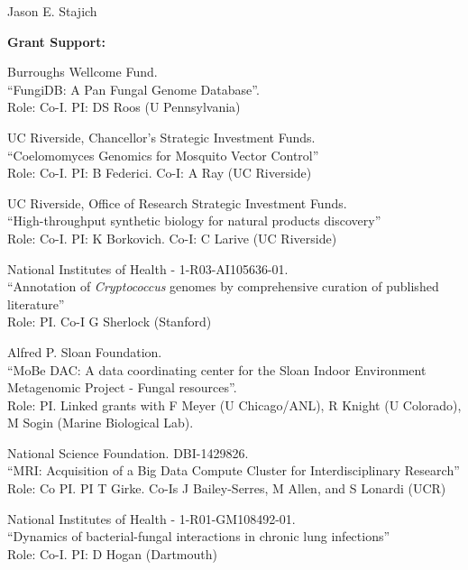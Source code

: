 \documentclass[10pt]{article}
\begin{document}
\begin{cv}{\centerline{Jason E. Stajich}}
\begin{cvlistcompact}{\bf Grant Support:}
\item [{\bf Completed support}]

\item [2010-2013] Burroughs Wellcome Fund. \\
 ``FungiDB: A Pan Fungal Genome Database''. \\
Role: Co-I. PI: DS Roos (U Pennsylvania)

\item [2011-2012] UC Riverside, Chancellor's Strategic Investment
  Funds. \\
``Coelomomyces Genomics for Mosquito Vector Control'' \\
Role: Co-I. PI: B Federici. Co-I: A Ray (UC Riverside)

\item [2013-2014] UC Riverside, Office of Research Strategic Investment
  Funds. \\
``High-throughput synthetic biology for natural products discovery'' \\
Role: Co-I. PI: K Borkovich. Co-I: C Larive (UC Riverside)

\item [2013-2014] National Institutes of Health - 1-R03-AI105636-01. \\
``Annotation of \textit{Cryptococcus} genomes by comprehensive
  curation of published literature'' \\
Role: PI. Co-I G Sherlock (Stanford)

  \item [2011-2014] Alfred P. Sloan Foundation. \\
``MoBe DAC: A data coordinating center for the Sloan Indoor
Environment Metagenomic Project - Fungal resources''. \\
Role: PI.  Linked grants with F Meyer (U Chicago/ANL), R Knight (U Colorado), M Sogin (Marine Biological Lab).

\item [2014-2015] National Science Foundation. DBI-1429826. \\
``MRI: Acquisition of a Big Data Compute Cluster for Interdisciplinary
  Research''
Role: Co PI. PI T Girke. Co-Is J Bailey-Serres, M Allen, and S Lonardi (UCR)

\item [2014-2017] National Institutes of Health - 1-R01-GM108492-01. \\
``Dynamics of bacterial-fungal interactions in chronic lung infections'' \\
  Role: Co-I. PI: D Hogan (Dartmouth)


\end{cvlistcompact}
\end{cv}
\end{document}
